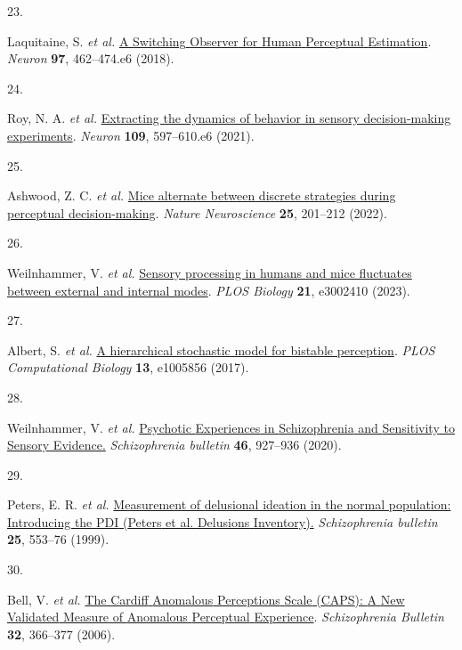 \documentclass[
]{article}
\newlength{\cslhangindent}
\newlength{\csllabelwidth}
\newenvironment{CSLReferences}[2] %
 {\begin{list}{}{%
  \setlength{\itemindent}{0pt}
  \setlength{\leftmargin}{0pt}
  \setlength{\parsep}{0pt}
  \ifodd #1
   \setlength{\leftmargin}{\cslhangindent}
   \setlength{\itemindent}{-1\cslhangindent}
  \fi
  \setlength{\itemsep}{#2\baselineskip}}}
 {\end{list}}
\newcommand{\CSLLeftMargin}[1]{\parbox[t]{\csllabelwidth}{\strut#1\strut}}
\newcommand{\CSLRightInline}[1]{\parbox[t]{\linewidth - \csllabelwidth}{\strut#1\strut}}
\begin{document}
\begin{CSLReferences}{0}{0}
\CSLLeftMargin{23. }%
\CSLRightInline{Laquitaine, S. \emph{et al.}
\href{https://doi.org/10.1016/j.neuron.2017.12.011}{A {Switching}
{Observer} for {Human} {Perceptual} {Estimation}}. \emph{Neuron}
\textbf{97}, 462--474.e6 (2018).}

\CSLLeftMargin{24. }%
\CSLRightInline{Roy, N. A. \emph{et al.}
\href{https://doi.org/10.1016/J.NEURON.2020.12.004}{Extracting the
dynamics of behavior in sensory decision-making experiments}.
\emph{Neuron} \textbf{109}, 597--610.e6 (2021).}

\CSLLeftMargin{25. }%
\CSLRightInline{Ashwood, Z. C. \emph{et al.}
\href{https://doi.org/10.1038/s41593-021-01007-z}{Mice alternate between
discrete strategies during perceptual decision-making}. \emph{Nature
Neuroscience} \textbf{25}, 201--212 (2022).}

\CSLLeftMargin{26. }%
\CSLRightInline{Weilnhammer, V. \emph{et al.}
\href{https://doi.org/10.1371/journal.pbio.3002410}{Sensory processing
in humans and mice fluctuates between external and internal modes}.
\emph{PLOS Biology} \textbf{21}, e3002410 (2023).}

\CSLLeftMargin{27. }%
\CSLRightInline{Albert, S. \emph{et al.}
\href{https://doi.org/10.1371/journal.pcbi.1005856}{A hierarchical
stochastic model for bistable perception}. \emph{PLOS Computational
Biology} \textbf{13}, e1005856 (2017).}

\CSLLeftMargin{28. }%
\CSLRightInline{Weilnhammer, V. \emph{et al.}
\href{http://www.ncbi.nlm.nih.gov/pubmed/32090246}{Psychotic
{Experiences} in {Schizophrenia} and {Sensitivity} to {Sensory}
{Evidence}.} \emph{Schizophrenia bulletin} \textbf{46}, 927--936
(2020).}

\CSLLeftMargin{29. }%
\CSLRightInline{Peters, E. R. \emph{et al.}
\href{https://www.ncbi.nlm.nih.gov/pubmed/10478789}{Measurement of
delusional ideation in the normal population: Introducing the {PDI}
({Peters} et al. {Delusions} {Inventory}).} \emph{Schizophrenia
bulletin} \textbf{25}, 553--76 (1999).}

\CSLLeftMargin{30. }%
\CSLRightInline{Bell, V. \emph{et al.}
\href{https://doi.org/10.1093/schbul/sbj014}{The {Cardiff} {Anomalous}
{Perceptions} {Scale} ({CAPS}): {A} {New} {Validated} {Measure} of
{Anomalous} {Perceptual} {Experience}}. \emph{Schizophrenia Bulletin}
\textbf{32}, 366--377 (2006).}


\end{CSLReferences}
\end{document}
